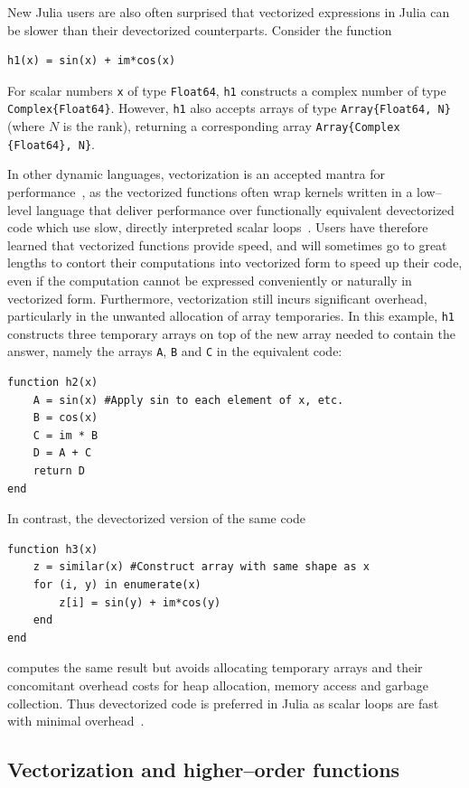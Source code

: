 \documentclass[pldi]{sigplanconf-pldi15}
\begin{document}
New Julia users are also often surprised that vectorized expressions in Julia
can be slower than their devectorized counterparts. Consider the function

\begin{lstlisting}
h1(x) = sin(x) + im*cos(x)
\end{lstlisting}
%
For scalar numbers \verb|x| of type \verb|Float64|, \verb|h1| constructs a
complex number of type \verb|Complex{Float64}|. However, \verb|h1| also accepts
arrays of type \verb|Array{Float64, N}| (where $N$ is the rank), returning a
corresponding array \verb|Array{Complex| \verb|{Float64}, N}|.

In other dynamic languages, vectorization is an accepted mantra for
performance~\cite{matlabuserguide,Langtangen2008}, as the vectorized functions often wrap
kernels written in a low--level language that deliver performance over
functionally equivalent devectorized code which use slow, directly interpreted
scalar loops~\cite{Seljebotn2009,Walt2011}. Users have therefore learned that
vectorized functions provide speed, and will sometimes go to great lengths to
contort their computations into vectorized form to speed up their code, even if
the computation cannot be expressed conveniently or naturally in vectorized
form. Furthermore, vectorization still incurs significant overhead,
particularly in the unwanted allocation of array temporaries. In this example,
\verb|h1| constructs three temporary arrays on top of the new array needed to
contain the answer, namely the arrays \verb|A|, \verb|B| and \verb|C| in the
equivalent code: 

\begin{lstlisting}
function h2(x)
    A = sin(x) #Apply sin to each element of x, etc.
    B = cos(x)
    C = im * B
    D = A + C
    return D
end
\end{lstlisting}
%
In contrast, the devectorized version of the same code

\begin{lstlisting}
function h3(x)
    z = similar(x) #Construct array with same shape as x
    for (i, y) in enumerate(x)
        z[i] = sin(y) + im*cos(y)
    end
end
\end{lstlisting}
%
computes the same result but avoids allocating temporary arrays and their
concomitant overhead costs for heap allocation, memory access and garbage
collection. Thus devectorized code is preferred in Julia as scalar loops are
fast with minimal overhead~\cite{Bezanson2014b}. 


\subsection{Vectorization and higher--order functions}
\end{document}

